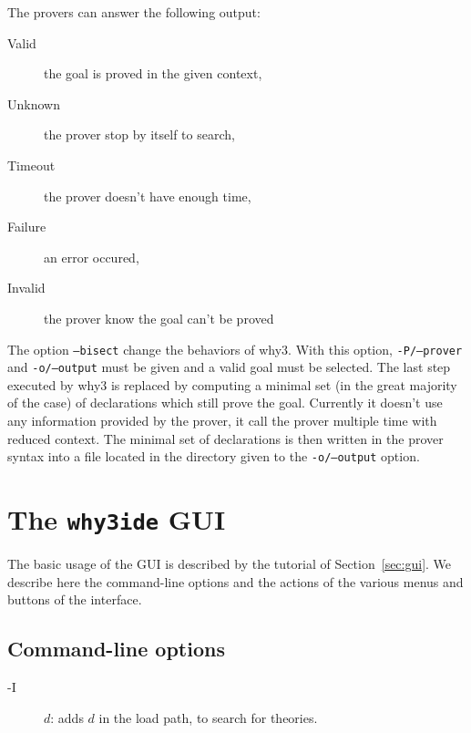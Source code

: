 The provers can answer the following output:
\begin{description}
\item[Valid] the goal is proved in the given context,
\item[Unknown] the prover stop by itself to search,
\item[Timeout] the prover doesn't have enough time,
\item[Failure] an error occured,
\item[Invalid] the prover know the goal can't be proved
\end{description}

The option \texttt{--bisect} change the behaviors of why3. With this
option, \texttt{-P/--prover} and \texttt{-o/--output} must be given
and a valid goal must be selected. The last step executed by why3 is
replaced by computing a minimal set (in the great majority of the
case) of declarations which still prove the goal. Currently it doesn't
use any information provided by the prover, it call the prover
multiple time with reduced context. The minimal set of declarations is
then written in the prover syntax into a file located in the directory
given to the \texttt{-o/--output} option.

\section{The \texttt{why3ide} GUI}
\label{sec:ideref}

The basic usage of the GUI is described by the tutorial of
Section~\ref{sec:gui}. We describe here the command-line options and
the actions of the various menus and buttons of the interface.

\subsection{Command-line options}

\begin{description}
\item[-I] $d$: adds $d$ in the load path, to search for theories.
\end{description}

